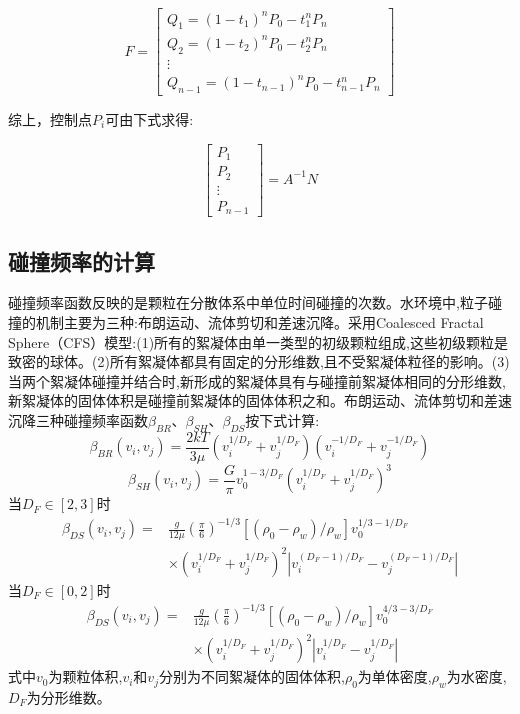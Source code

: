 \begin{equation*}
    F=\left[
        \begin{array}{c}
            Q_1=(1-t_1)^nP_0-t_1^nP_n\\
            Q_2=(1-t_2)^nP_0-t_2^nP_n\\
            \vdots\\
            Q_{n-1}=(1-t_{n-1})^nP_0-t_{n-1}^nP_n
        \end{array}
    \right]
\end{equation*}

综上，控制点$P_i$可由下式求得:

\begin{equation}
    \left[
        \begin{array}{c}
            P_1\\
            P_2\\
            \vdots\\
            P_{n-1}
        \end{array}
    \right]
    =
    A^{-1}N
\end{equation}



\subsection{碰撞频率的计算}

碰撞频率函数反映的是颗粒在分散体系中单位时间碰撞的次数。水环境中,粒子碰撞的机制主要为三种:布朗运动、流体剪切和差速沉降\cite{ThomasJudd-749}。采用Coalesced Fractal Sphere（CFS）模型\cite{LeeBonner-748}:(1)所有的絮凝体由单一类型的初级颗粒组成,这些初级颗粒是致密的球体。(2)所有絮凝体都具有固定的分形维数,且不受絮凝体粒径的影响。(3) 当两个絮凝体碰撞并结合时,新形成的絮凝体具有与碰撞前絮凝体相同的分形维数,新絮凝体的固体体积是碰撞前絮凝体的固体体积之和。布朗运动、流体剪切和差速沉降三种碰撞频率函数$\beta_{BR}$、$\beta_{SH}$、$\beta_{DS}$按下式计算\cite{LeeBonner-748}:
\begin{equation}\label{beta_br}
    \beta_{BR}(v_i,v_j)=\frac{2kT}{3\mu}(v_i^{1/D_F}+v_j^{1/D_F})(v_i^{-1/D_F}+v_j^{-1/D_F})
\end{equation}
\begin{equation}\label{beta_sh}
    \beta_{SH}(v_i,v_j)=\frac{G}{\pi}v_0^{1-3/D_F}{(v_i^{1/D_F}+v_j^{1/D_F})}^3
\end{equation}
当$D_F\in[2,3]$时
\begin{align}\label{beta_ds}
    \beta_{DS}(v_i,v_j)=&\frac{g}{12\mu}{(\frac{\pi}{6})}^{-1/3}[(\rho_0-\rho_w)/\rho_w]v_0^{1/3-1/D_F}\\ & \times(v_i^{1/D_F}+v_j^{1/D_F})^2\left|v_i^{(D_F-1)/D_F}-v_j^{(D_F-1)/D_F}\right| \nonumber
\end{align}
当$D_F\in[0,2]$时
\begin{align}
    \beta_{DS}(v_i,v_j)=&\frac{g}{12\mu}{(\frac{\pi}{6})}^{-1/3}[(\rho_0-\rho_w)/\rho_w]v_0^{4/3-3/D_F}\\ &\times(v_i^{1/D_F}+v_j^{1/D_F})^2\left|v_i^{1/D_F}-v_j^{1/D_F}\right| \nonumber
\end{align}
式中$v_0$为颗粒体积,$v_i$和$v_j$分别为不同絮凝体的固体体积,$\rho_0$为单体密度,$\rho_w$为水密度,$D_F$为分形维数。

